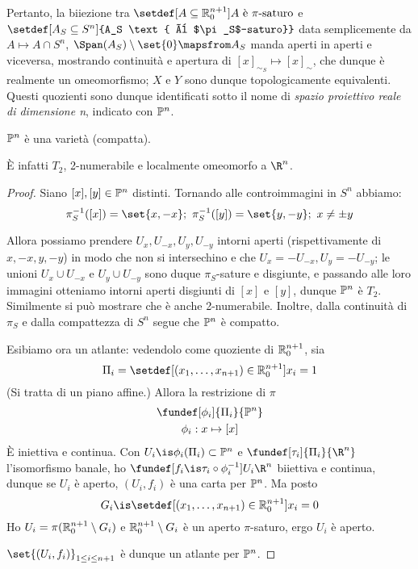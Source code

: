 Pertanto, la biiezione tra $\setdef[A \subseteq {\Ro[n+1]} ]{A \text{ è $\pi$-saturo}}$ e $\setdef[A_S\subseteq S^n]{A_S \text{ è $\pi_S$-saturo}}$ data semplicemente da $A\mapsto A\cap S^n$, $\Span(A_S)\setminus \set{0} \mapsfrom A_S$ manda aperti in aperti e viceversa, mostrando continuità e apertura di $[x]_{\sim_S}  \mapsto  [x]_\sim$, che dunque è realmente un omeomorfismo; $X$ e $Y$ sono dunque topologicamente equivalenti. Questi quozienti sono dunque identificati sotto il nome di \emph{spazio proiettivo reale di dimensione n}, indicato con $\Ps^n$.

\begin{prop} $\Ps^n$ è una varietà (compatta). \end{prop}
È infatti $T_2$, 2-numerabile e localmente omeomorfo a $\R^n$.

\begin{proof}
Siano $[x], [y] \in \Ps^n$ distinti. Tornando alle controimmagini in $S^n$ abbiamo: \[
\pi_S^{-1}([x]) = \set{x, -x}; \
\pi_S^{-1}([y]) = \set{y, -y}; \
x \neq \pm y \]

Allora possiamo prendere $U_x, U_{-x}, U_y, U_{-y}$ intorni aperti (rispettivamente di $x, -x, y, -y$) in modo che non si intersechino e che $U_x = -U_{-x}, U_y = -U_{-y}$; le unioni $U_x \cup U_{-x}$ e $U_y \cup U_{-y}$ sono duque $\pi_S$-sature e disgiunte, e passando alle loro immagini otteniamo intorni aperti disgiunti di $[x]$ e $[y]$, dunque $\Ps^n$ è $T_2$. Similmente si può mostrare che è anche 2-numerabile. Inoltre, dalla continuità di $\pi_S$ e dalla compattezza di $S^n$ segue che $\Ps^n $ è compatto.

Esibiamo ora un atlante: vedendolo come quoziente di $\Ro[n+1]$, sia \[
\Pi_i = \setdef[(x_1, \dots, x_{n+1})\in {\Ro[n+1]}]{x_i = 1} \]
\marginpar{\dots sia $\Pi_i$ il piano affine: (a capo)\dots}
(Si tratta di un piano affine.) Allora la restrizione di $\pi$
\begin{gather*}
\fundef[\phi_i]{\Pi_i}{\Ps^n} \\
\phi_i : x \mapsto [x]
\end{gather*}
È iniettiva e continua. Con $U_i \is \phi_i(\Pi_i) \subset \Ps^n$ e $\fundef[\tau_i]{\Pi_i}{\R^n}$ l'isomorfismo banale, ho $\fundef[f_i \is \tau_i \circ \phi_i^{-1}]{U_i}{\R^n}$ biiettiva e continua, dunque se $U_i$ è aperto, $(U_i, f_i)$ è una carta per $\Ps^n$. Ma posto \[
G_i \is \setdef[(x_1, \dots, x_{n+1})\in {\Ro[n+1]}]{x_i = 0} \]
Ho $U_i = \pi(\Ro[n+1] \setminus G_i)$ e $\Ro[n+1] \setminus G_i$ è un aperto $\pi$-saturo, ergo $U_i$ è aperto.

$\set{(U_i, f_i)}_{1 \leq i \leq n+1}$ è dunque un atlante per $\Ps^n$.
\end{proof}

